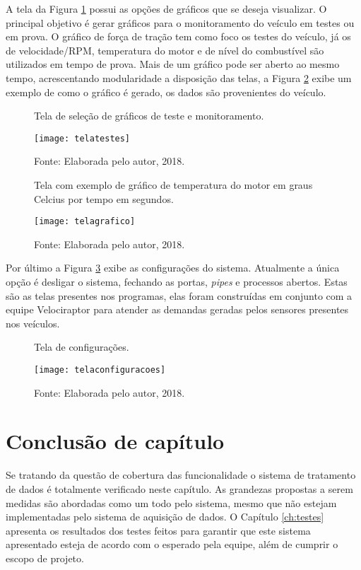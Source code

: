 A tela da Figura \ref{fig:telatestes} possui as opções de gráficos que se deseja visualizar. O principal objetivo é gerar gráficos para o monitoramento do veículo em testes ou em prova. O gráfico de força de tração tem como foco os testes do veículo, já os de velocidade/RPM, temperatura do motor e de nível do combustível são utilizados em tempo de prova. Mais de um gráfico pode ser aberto ao mesmo tempo, acrescentando modularidade a disposição das telas, a Figura \ref{fig:telagrafico} exibe um exemplo de como o gráfico é gerado, os dados são provenientes do veículo.

\begin{figure}[!htb]
	\centering
		\caption{Tela de seleção de gráficos de teste e monitoramento.}
		\texttt{[image: telatestes]} 
		\caption*{Fonte: Elaborada pelo autor, 2018.}
		\label{fig:telatestes}
\end{figure}    

\begin{figure}[!htb]
	\centering
		\caption{Tela com exemplo de gráfico de temperatura do motor em graus Celcius por tempo em segundos.}
		\texttt{[image: telagrafico]} 
		\caption*{Fonte: Elaborada pelo autor, 2018.}
		\label{fig:telagrafico}
\end{figure}    

Por último a Figura \ref{fig:telaconfiguracao} exibe as configurações do sistema. Atualmente a única opção é desligar o sistema, fechando as portas, \textit{pipes} e processos abertos. Estas são as telas presentes nos programas, elas foram construídas em conjunto com a equipe Velociraptor para atender as demandas geradas pelos sensores presentes nos veículos.


\begin{figure}[!htb]
	\centering
		\caption{Tela de configurações.}
		\texttt{[image: telaconfiguracoes]} 
		\caption*{Fonte: Elaborada pelo autor, 2018.}
		\label{fig:telaconfiguracao}
\end{figure}    

\section{Conclusão de capítulo}

Se tratando da questão de cobertura das funcionalidade o sistema de tratamento de dados é totalmente verificado neste capítulo. As grandezas propostas a serem medidas são abordadas como um todo pelo sistema, mesmo que não estejam implementadas pelo sistema de aquisição de dados. O Capítulo \ref{ch:testes} apresenta os resultados dos testes feitos para garantir que este sistema apresentado esteja de acordo com o esperado pela equipe, além de cumprir o escopo de projeto.